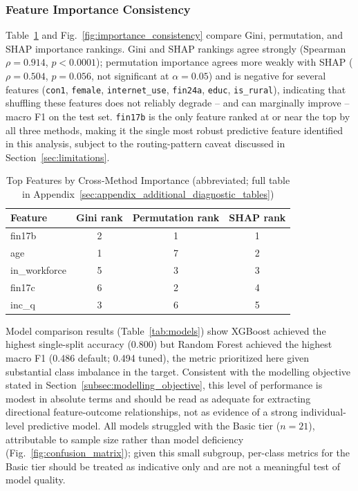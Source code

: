 \documentclass[conference]{IEEEtran}
\begin{document}
\subsubsection{Feature Importance Consistency}
\label{subsubsec:feature_importance_consistency_results}
Table~\ref{tab:importance_consistency} and Fig.~\ref{fig:importance_consistency} compare Gini, permutation, and SHAP importance rankings. Gini and SHAP rankings agree strongly (Spearman $\rho = 0.914$, $p < 0.0001$); permutation importance agrees more weakly with SHAP ($\rho = 0.504$, $p = 0.056$, not significant at $\alpha=0.05$) and is negative for several features (\texttt{con1}, \texttt{female}, \texttt{internet\_use}, \texttt{fin24a}, \texttt{educ}, \texttt{is\_rural}), indicating that shuffling these features does not reliably degrade -- and can marginally improve -- macro F1 on the test set. \texttt{fin17b} is the only feature ranked at or near the top by all three methods, making it the single most robust predictive feature identified in this analysis, subject to the routing-pattern caveat discussed in Section~\ref{sec:limitations}.

\begin{table}[h]
\caption{Top Features by Cross-Method Importance (abbreviated; full table in Appendix~\ref{sec:appendix_additional_diagnostic_tables})}
\label{tab:importance_consistency}
\centering
\begin{tabular}{@{}lccc@{}}
\toprule
Feature & Gini rank & Permutation rank & SHAP rank \\
\midrule
fin17b & 2 & 1 & 1 \\
age & 1 & 7 & 2 \\
in\_workforce & 5 & 3 & 3 \\
fin17c & 6 & 2 & 4 \\
inc\_q & 3 & 6 & 5 \\
\bottomrule
\end{tabular}
\end{table}

Model comparison results (Table~\ref{tab:models}) show XGBoost achieved the highest
single-split accuracy (0.800) but Random Forest achieved the highest macro
F1 (0.486 default; 0.494 tuned), the metric prioritized here given
substantial class imbalance in the target. Consistent with the modelling
objective stated in Section~\ref{subsec:modelling_objective}, this level of performance is modest
in absolute terms and should be read as adequate for extracting directional
feature-outcome relationships, not as evidence of a strong individual-level
predictive model. All models struggled with the Basic tier ($n=21$),
attributable to sample size rather than model deficiency (Fig.~\ref{fig:confusion_matrix}); given
this small subgroup, per-class metrics for the Basic tier should be
treated as indicative only and are not a meaningful test of model quality.
 
\end{document}
